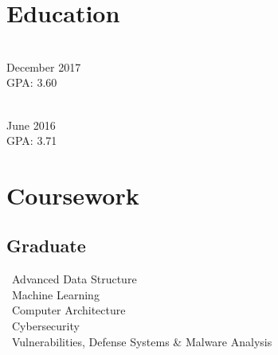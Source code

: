 \documentclass[]{deedy_format_Hien}
\begin{document}
\begin{minipage}[t]{0.325\textwidth} 


\vspace{2mm}
\section{Education} 
\vspace{2mm} %
\\
December 2017 \\ GPA: 3.60
\sectionsep

\\		
June 2016 \\ GPA: 3.71
\sectionsep


\section{Coursework}
\vspace{2mm} %
\flushleft
\subsection{Graduate}
\vspace{1mm}
\textbullet \, Advanced Data Structure \\
\textbullet \, Machine Learning \\
\textbullet \, Computer Architecture \\
\textbullet \, Cybersecurity \\
\textbullet \, Vulnerabilities, Defense Systems \& Malware Analysis \\


\end{minipage}
\end{document}
